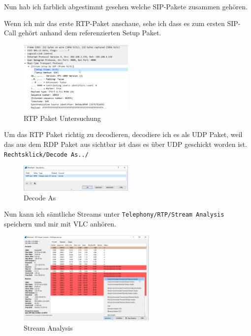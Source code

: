 \documentclass[12pt,a4paper,titlepage,oneside]{scrartcl}
\begin{document}
Nun hab ich farblich abgestimmt gesehen welche SIP-Pakete zusammen gehören.

Wenn ich mir das erste RTP-Paket anschaue, sehe ich dass es zum ersten SIP-Call gehört anhand dem referenzierten Setup Paket.

\begin{figure}[h!]
  \centering
    \includegraphics[width=0.5\textwidth]{./imgs/intranet_screenshots/ws_rtppaket.png}
  \caption{RTP Paket Untersuchung}
  \label{fig:rtppacket}
\end{figure}

Um das RTP Paket richtig zu decodieren, decodiere ich es als UDP Paket, weil das aus dem RDP Paket aus sichtbar ist dass es über UDP geschickt worden ist. \lstinline{Rechtsklick/Decode As../}

\begin{figure}[h!]
  \centering
    \includegraphics[width=0.5\textwidth]{./imgs/intranet_screenshots/ws_decodeas.png}
  \caption{Decode As}
  \label{fig:rtppacket}
\end{figure}

Nun kann ich sämtliche Streams unter \lstinline{Telephony/RTP/Stream Analysis} speichern und mir mit VLC anhören.

\begin{figure}[h!]
  \centering
    \includegraphics[width=0.6\textwidth]{./imgs/intranet_screenshots/ws_streamanalysis.png}
  \caption{Stream Analysis}
  \label{fig:rtppacket}
\end{figure}
\end{document}
